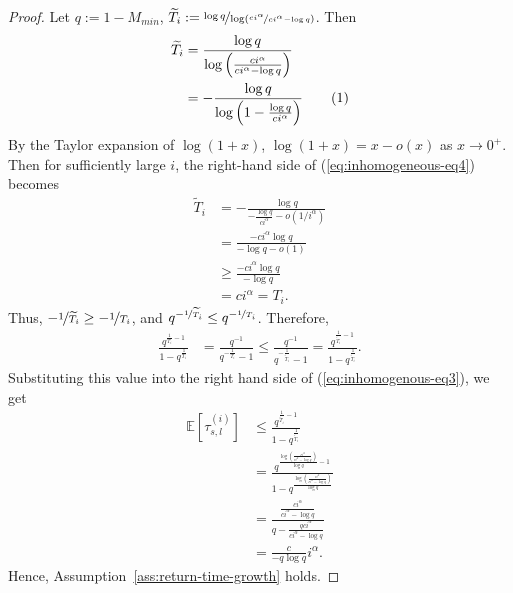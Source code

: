 \documentclass[twoside,11pt]{article}
\numberwithin{equation}{section}
\newcommand{\lp}{\left(}
\newcommand{\rp}{\right)}
\newcommand\numberthis{\addtocounter{equation}{1}\tag{\theequation}}
\newcommand{\expec}{\mathbb{E}}
\begin{document}
\begin{proof}
Let $q := 1 - M_{min}$, $\widetilde T_i := \nicefrac{\log q}{\log\lp \nicefrac{c i^\alpha}{c i^\alpha - \log q} \rp}$.
Then 
\begin{align*}
    \widetilde T_i & = \frac{\log q}{\log\lp \frac{c i^\alpha}{c i^\alpha - \log q} \rp} \\
    &= - \frac{\log q}{\log \lp 1 - \frac{\log q}{c i^\alpha}\rp} \numberthis \label{eq:inhomogeneous-eq4}
\end{align*}
By the Taylor expansion of $\log(1+x)$, $\log(1+x) = x - o(x)$ as $x \to 0^+$. 
Then for sufficiently large $i$, the right-hand side of (\ref{eq:inhomogeneous-eq4}) becomes
\begin{align*}
     \widetilde T_i   &= - \frac{\log q}{-\frac{\log q}{c i^\alpha} - o(1/i^\alpha)} \\
    &= \frac{-c i^\alpha \log q}{-\log q - o(1)} \\
    & \geq \frac{-c i^\alpha \log q}{-\log q} \\
    &= c i^\alpha = T_i.
\end{align*}
Thus, $- \nicefrac{1}{\widetilde T_i} \geq - \nicefrac{1}{T_i}$, and $q^{-\nicefrac{1}{\widetilde T_i}} \leq q^{-\nicefrac{1}{T_i}}$.
Therefore,
\begin{align*}
    \frac{q^{\frac{1}{T_i}-1}}{1- q^{\frac{1}{T_i}}} &= \frac{q^{-1}}{ q^{-\frac{1}{T_i}} - 1} \leq \frac{ q^{-1}}{q^{-\frac{1}{\widetilde T_i}} - 1} = \frac{q^{\frac{1}{\widetilde T_i}-1}}{1-q^{\frac{1}{\widetilde T_i}}}.
\end{align*}
Substituting this value into the right hand side of (\ref{eq:inhomogenous-eq3}), we get
\begin{align*}
    \expec[\tau_{s,l}^{(i)}] & \leq \frac{q^{\frac{1}{\widetilde T_i}-1}}{1-q^{\frac{1}{\widetilde T_i}}} \\
     &= \frac{q^{\frac{\log\lp \frac{c i^\alpha}{c i^\alpha - \log q} \rp}{\log q}-1}}{1-q^{\frac{\log\lp \frac{c i^\alpha}{c i^\alpha - \log q} \rp}{\log q}}}\\
    &=\frac{\frac{c i^\alpha}{c i^\alpha - \log q}}{q-\frac{q c i^\alpha}{c i^\alpha - \log q}}\\
    &= \frac{c}{-q \log q} i^\alpha.
\end{align*}
Hence, Assumption~\ref{ass:return-time-growth} holds.


\end{proof}
\end{document}
